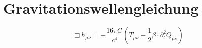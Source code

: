 \section{Gravitationswellengleichung}
\[ \Box h_{\mu\nu} = -\frac{16\pi G}{c^4} \left( T_{\mu\nu} - \frac{1}{2} \beta \cdot \partial_t^2 Q_{\mu\nu} \right) \]